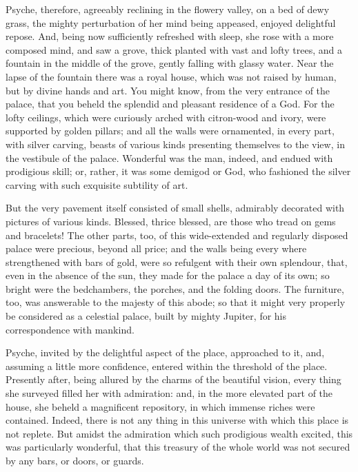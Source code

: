 \documentclass[12pt]{article}
\begin{document}
Psyche, therefore, agreeably reclining in the flowery valley, on a bed of dewy
grass, the mighty perturbation of her mind being appeased, enjoyed delightful
repose. And, being now sufficiently refreshed with sleep, she rose with a more
composed mind, and saw a grove, thick planted with vast and lofty trees, and a
fountain in the middle of the grove, gently falling with glassy water.  Near
the lapse of the fountain there was a royal house, which was not raised by
human, but by divine hands and art. You might know, from the very entrance of
the palace, that you beheld the splendid and pleasant residence of a God. For
the lofty ceilings, which were curiously arched with citron-wood and ivory,
were supported by golden pillars; and all the walls were ornamented, in every
part, with silver carving, beasts of various kinds presenting themselves to the
view, in the vestibule of the palace. Wonderful was the man, indeed, and endued
with prodigious skill; or, rather, it was some demigod or God, who fashioned
the silver carving with such exquisite subtility of art.

But the very pavement itself consisted of small shells, admirably decorated
with pictures of various kinds. Blessed, thrice blessed, are those who tread on
gems and bracelets! The other parts, too, of this wide-extended and regularly
disposed palace were precious, beyond all price; and the walls being every
where strengthened with bars of gold, were so refulgent with their own
splendour, that, even in the absence of the sun, they made for the palace a day
of its own; so bright were the bedchambers, the porches, and the folding doors.
The furniture, too, was answerable to the majesty of this abode; so that it
might very properly be considered as a celestial palace, built by mighty
Jupiter, for his correspondence with mankind.

Psyche, invited by the delightful aspect of the place, approached to it, and,
assuming a little more confidence, entered within the threshold of the place.
Presently after, being allured by the charms of the beautiful vision, every
thing she surveyed filled her with admiration: and, in the more elevated part
of the house, she beheld a magnificent repository, in which immense riches were
contained. Indeed, there is not any thing in this universe with which this
place is not replete. But amidst the admiration which such prodigious wealth
excited, this was particularly wonderful, that this treasury of the whole world
was not secured by any bars, or doors, or guards.
\end{document}
